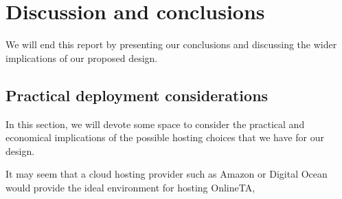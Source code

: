 \chapter{Discussion and conclusions}
We will end this report by presenting our conclusions and discussing
the wider implications of our proposed design.

\section{Practical deployment considerations}
In this section, we will devote some space to consider the practical
and economical implications of the possible hosting choices that we
have for our design.

It may seem that a cloud hosting provider such as Amazon or Digital
Ocean would provide the ideal environment for hosting OnlineTA,





